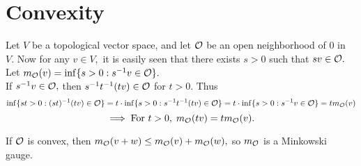 \section{Convexity}
Let $V$ be a topological vector space, and let $\mathcal{O}$ be an open neighborhood of $0$ in $V.$ Now for any $v\in V,$ it is easily seen that there exists $s>0$ such that $sv\in\mathcal{O}.$ \\ Let $m_{\mathcal{O}}(v)=\inf\{s>0:s^{-1}v\in\mathcal{O}\}.$ \\
If $s^{-1}v\in\mathcal{O},$ then $s^{-1}t^{-1}(tv)\in\mathcal{O}$ for $t>0.$ Thus 
$$\inf\{st>0:(st)^{-1}(tv)\in\mathcal{O}\}=t\cdot\inf\{s>0:s^{-1}t^{-1}(tv)\in\mathcal{O}\}=t\cdot\inf\{s>0:s^{-1}v\in\mathcal{O}\}=tm_{\mathcal{O}}(v)$$
$$\implies\text{For } t>0,\;m_{\mathcal{O}}(tv)=tm_{\mathcal{O}}(v).$$

\begin{lemma}
If $\mathcal{O}$ is convex, then $m_{\mathcal{O}}(v+w)\leq m_{\mathcal{O}}(v)+ m_{\mathcal{O}}(w),$ so $m_{\mathcal{O}}$ is a Minkowski gauge. \\
\end{lemma}

